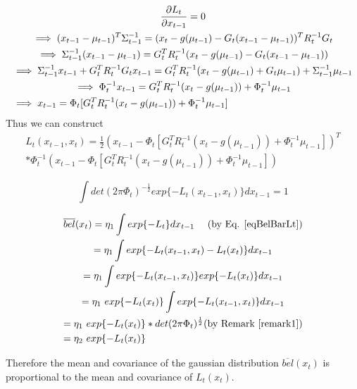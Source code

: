 \begin{multline}
\frac{\partial L_t}{\partial x_{t-1}} = 0 \\
\implies (x_{t-1} - \mu_{t-1})^T \Sigma_{t-1}^{-1} = (x_t - g(\mu_{t-1}) - G_t (x_{t-1} - \mu_{t-1}))^T R_t^{-1} G_t \\
\implies \Sigma_{t-1}^{-1} (x_{t-1} - \mu_{t-1}) = G_t^T R_t^{-1}  (x_t - g(\mu_{t-1}) - G_t (x_{t-1} - \mu_{t-1})) \\
\implies \Sigma_{t-1}^{-1} x_{t-1} + G_t^T R_t^{-1}G_t x_{t-1} = G_t^T R_t^{-1}  (x_t - g(\mu_{t-1}) + G_t \mu_{t-1}) + \Sigma_{t-1}^{-1} \mu_{t-1} \\
\implies \Phi_t^{-1} x_{t-1} = G_t^T R_t^{-1}  (x_t - g(\mu_{t-1})) + \Phi_t^{-1} \mu_{t-1} \\
\implies x_{t-1} = \Phi_t [G_t^T R_t^{-1}  (x_t - g(\mu_{t-1})) + \Phi_t^{-1} \mu_{t-1}] \hfill
\end{multline}
Thus we can construct
\begin{multline}
L_t(x_{t-1},x_t) = \frac{1}{2} (x_{t-1} - \Phi_t [G_t^T R_t^{-1}  (x_t - g(\mu_{t-1})) + \Phi_t^{-1} \mu_{t-1}])^T \\
* \Phi_t^{-1} (x_{t-1} - \Phi_t [G_t^T R_t^{-1}  (x_t - g(\mu_{t-1})) + \Phi_t^{-1} \mu_{t-1}])
\end{multline}

\begin{remark} \label{remark1}

\[
\int det(2 \pi \Phi_t)^{-\frac{1}{2}} exp\{-L_t(x_{t-1},x_t)\}dx_{t-1} = 1
\]
\end{remark}

\begin{multline}
\overline{bel}(x_t) = \eta_1 \int exp\{-L_t\}dx_{t-1} \hfill \text{(by Eq. \ref{eqBelBarLt})} \\
= \eta_1 \int exp\{-L_t(x_{t-1},x_t) - L_t(x_t)\}dx_{t-1} \\
= \eta_1 \int exp\{-L_t(x_{t-1},x_t)\} exp \{ - L_t(x_t)\}dx_{t-1} \\
= \eta_1\ exp \{ - L_t(x_t)\} \int exp\{-L_t(x_{t-1},x_t)\} dx_{t-1} \\
= \eta_1\ exp \{ - L_t(x_t)\} * det(2 \pi \Phi_t)^{\frac{1}{2}} \hfill \text{(by Remark \ref{remark1})} \\
= \eta_2\ exp \{ - L_t(x_t)\} \hfill
\end{multline}

Therefore the mean and covariance of the gaussian distribution \(\overline{bel}(x_t)\) is proportional to the mean and covariance of \(L_t(x_t)\).

